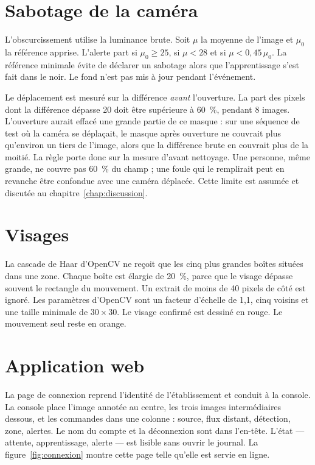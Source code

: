 \section{Sabotage de la caméra}

L'obscurcissement utilise la luminance brute. Soit $\mu$ la moyenne de l'image et $\mu_0$ la référence apprise. L'alerte part si $\mu_0 \ge 25$, si $\mu < 28$ et si $\mu < 0{,}45\,\mu_0$. La référence minimale évite de déclarer un sabotage alors que l'apprentissage s'est fait dans le noir. Le fond n'est pas mis à jour pendant l'événement.

Le déplacement est mesuré sur la différence \emph{avant} l'ouverture. La part des pixels dont la différence dépasse 20 doit être supérieure à 60~\%, pendant 8 images. L'ouverture aurait effacé une grande partie de ce masque : sur une séquence de test où la caméra se déplaçait, le masque après ouverture ne couvrait plus qu'environ un tiers de l'image, alors que la différence brute en couvrait plus de la moitié. La règle porte donc sur la mesure d'avant nettoyage. Une personne, même grande, ne couvre pas 60~\% du champ ; une foule qui le remplirait peut en revanche être confondue avec une caméra déplacée. Cette limite est assumée et discutée au chapitre~\ref{chap:discussion}.

\section{Visages}

La cascade de Haar d'OpenCV ne reçoit que les cinq plus grandes boîtes situées dans une zone. Chaque boîte est élargie de 20~\%, parce que le visage dépasse souvent le rectangle du mouvement. Un extrait de moins de 40 pixels de côté est ignoré. Les paramètres d'OpenCV sont un facteur d'échelle de 1{,}1, cinq voisins et une taille minimale de $30\times 30$. Le visage confirmé est dessiné en rouge. Le mouvement seul reste en orange.

\section{Application web}

La page de connexion reprend l'identité de l'établissement et conduit à la console. La console place l'image annotée au centre, les trois images intermédiaires dessous, et les commandes dans une colonne : source, flux distant, détection, zone, alertes. Le nom du compte et la déconnexion sont dans l'en-tête. L'état --- attente, apprentissage, alerte --- est lisible sans ouvrir le journal. La figure~\ref{fig:connexion} montre cette page telle qu'elle est servie en ligne.

